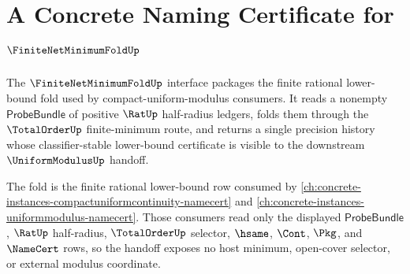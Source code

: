 \chapter{A Concrete Naming Certificate for $\FiniteNetMinimumFoldUp$}
\label{ch:concrete-instances-finitenetminimumfold-namecert}

The $\FiniteNetMinimumFoldUp$ interface packages the finite rational lower-bound fold used by compact-uniform-modulus consumers. It reads a nonempty $\mathsf{ProbeBundle}$ of positive $\RatUp$ half-radius ledgers, folds them through the $\TotalOrderUp$ finite-minimum route, and returns a single precision history whose classifier-stable lower-bound certificate is visible to the downstream $\UniformModulusUp$ handoff.

The fold is the finite rational lower-bound row consumed by \autoref{ch:concrete-instances-compactuniformcontinuity-namecert} and \autoref{ch:concrete-instances-uniformmodulus-namecert}. Those consumers read only the displayed $\mathsf{ProbeBundle}$, $\RatUp$ half-radius, $\TotalOrderUp$ selector, $\hsame$, $\Cont$, $\Pkg$, and $\NameCert$ rows, so the handoff exposes no host minimum, open-cover selector, or external modulus coordinate.

